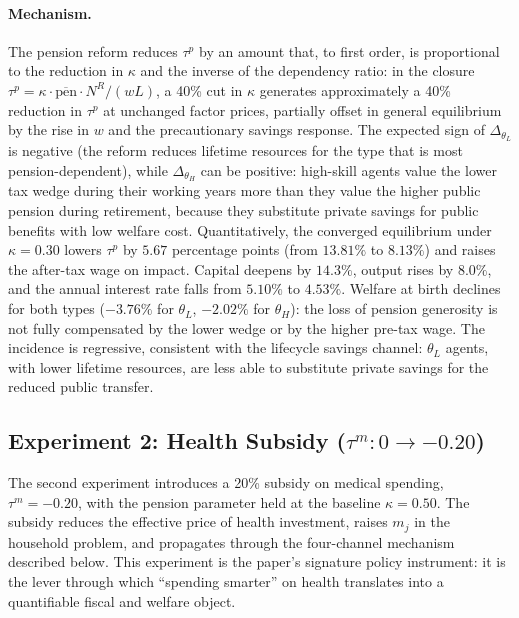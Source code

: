 \documentclass[12pt,a4paper]{article}
\begin{document}
\paragraph{Mechanism.} The pension reform reduces $\tau^{p}$ by an
amount that, to first order, is proportional to the reduction in
$\kappa$ and the inverse of the dependency ratio: in the closure
$\tau^{p} = \kappa \cdot \overline{\text{pen}} \cdot N^{R}/(wL)$, a
40\% cut in $\kappa$ generates approximately a 40\% reduction in
$\tau^{p}$ at unchanged factor prices, partially offset in general
equilibrium by the rise in $w$ and the precautionary savings response.
The expected sign of $\Delta_{\theta_{L}}$ is negative (the reform
reduces lifetime resources for the type that is most pension-dependent),
while $\Delta_{\theta_{H}}$ can be positive: high-skill agents value
the lower tax wedge during their working years more than they value
the higher public pension during retirement, because they substitute
private savings for public benefits with low welfare cost.
Quantitatively, the converged equilibrium under $\kappa=0.30$ lowers $\tau^{p}$ by $5.67$ percentage points (from $13.81\%$ to $8.13\%$) and raises the after-tax wage on impact. Capital deepens by $14.3\%$, output rises by $8.0\%$, and the annual interest rate falls from $5.10\%$ to $4.53\%$. Welfare at birth declines for both types ($-3.76\%$ for $\theta_{L}$, $-2.02\%$ for $\theta_{H}$): the loss of pension generosity is not fully compensated by the lower wedge or by the higher pre-tax wage. The incidence is regressive, consistent with the lifecycle savings channel: $\theta_{L}$ agents, with lower lifetime resources, are less able to substitute private savings for the reduced public transfer.

\subsection{Experiment 2: Health Subsidy ($\tau^{m}: 0 \to -0.20$)}
\label{subsec:exp_taum}

The second experiment introduces a 20\% subsidy on medical spending,
$\tau^{m} = -0.20$, with the pension parameter held at the baseline
$\kappa = 0.50$. The subsidy reduces the effective price of health
investment, raises $m_{j}$ in the household problem, and propagates
through the four-channel mechanism described below. This experiment
is the paper's signature policy instrument: it is the lever through
which ``spending smarter'' on health translates into a quantifiable
fiscal and welfare object.
\end{document}
